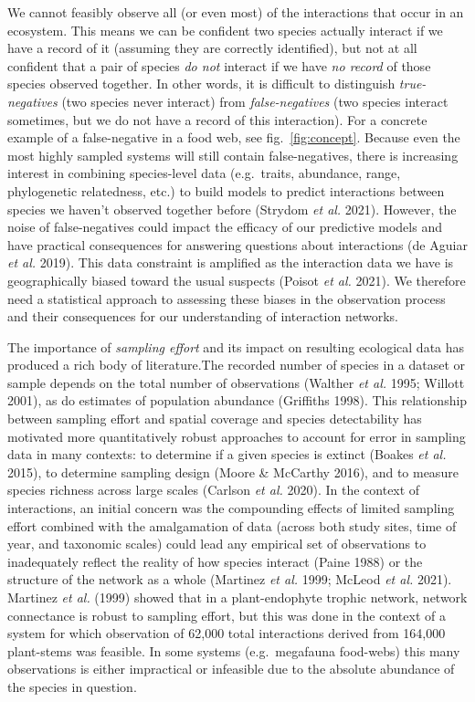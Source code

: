 \documentclass[11pt]{article}
\begin{document}
We cannot feasibly observe all (or even most) of the interactions that
occur in an ecosystem. This means we can be confident two species
actually interact if we have a record of it (assuming they are correctly
identified), but not at all confident that a pair of species \emph{do
not} interact if we have \emph{no record} of those species observed
together. In other words, it is difficult to distinguish
\emph{true-negatives} (two species never interact) from
\emph{false-negatives} (two species interact sometimes, but we do not
have a record of this interaction). For a concrete example of a
false-negative in a food web, see fig.~\ref{fig:concept}. Because even
the most highly sampled systems will still contain false-negatives,
there is increasing interest in combining species-level data
(e.g.~traits, abundance, range, phylogenetic relatedness, etc.) to build
models to predict interactions between species we haven't observed
together before (Strydom \emph{et al.} 2021). However, the noise of
false-negatives could impact the efficacy of our predictive models and
have practical consequences for answering questions about interactions
(de Aguiar \emph{et al.} 2019). This data constraint is amplified as the
interaction data we have is geographically biased toward the usual
suspects (Poisot \emph{et al.} 2021). We therefore need a statistical
approach to assessing these biases in the observation process and their
consequences for our understanding of interaction networks.

The importance of \emph{sampling effort} and its impact on resulting
ecological data has produced a rich body of literature.The recorded
number of species in a dataset or sample depends on the total number of
observations (Walther \emph{et al.} 1995; Willott 2001), as do estimates
of population abundance (Griffiths 1998). This relationship between
sampling effort and spatial coverage and species detectability has
motivated more quantitatively robust approaches to account for error in
sampling data in many contexts: to determine if a given species is
extinct (Boakes \emph{et al.} 2015), to determine sampling design (Moore
\& McCarthy 2016), and to measure species richness across large scales
(Carlson \emph{et al.} 2020). In the context of interactions, an initial
concern was the compounding effects of limited sampling effort combined
with the amalgamation of data (across both study sites, time of year,
and taxonomic scales) could lead any empirical set of observations to
inadequately reflect the reality of how species interact (Paine 1988) or
the structure of the network as a whole (Martinez \emph{et al.} 1999;
McLeod \emph{et al.} 2021). Martinez \emph{et al.} (1999) showed that in
a plant-endophyte trophic network, network connectance is robust to
sampling effort, but this was done in the context of a system for which
observation of 62,000 total interactions derived from 164,000
plant-stems was feasible. In some systems (e.g.~megafauna food-webs)
this many observations is either impractical or infeasible due to the
absolute abundance of the species in question.
\end{document}

